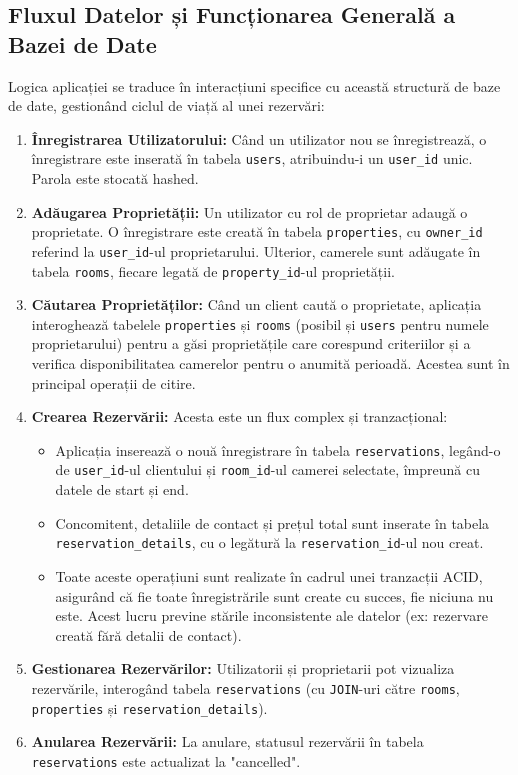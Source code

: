 \documentclass[12pt, a4paper, oneside, romanian]{teza-upb}
\begin{document}
\subsection{Fluxul Datelor și Funcționarea Generală a Bazei de Date}
Logica aplicației se traduce în interacțiuni specifice cu această structură de baze de date, gestionând ciclul de viață al unei rezervări:

\begin{enumerate}
	\item \textbf{Înregistrarea Utilizatorului:} Când un utilizator nou se înregistrează, o înregistrare este inserată în tabela \texttt{users}, atribuindu-i un \texttt{user\_id} unic. Parola este stocată hashed.
	\item \textbf{Adăugarea Proprietății:} Un utilizator cu rol de proprietar adaugă o proprietate. O înregistrare este creată în tabela \texttt{properties}, cu \texttt{owner\_id} referind la \texttt{user\_id}-ul proprietarului. Ulterior, camerele sunt adăugate în tabela \texttt{rooms}, fiecare legată de \texttt{property\_id}-ul proprietății.
	\item \textbf{Căutarea Proprietăților:} Când un client caută o proprietate, aplicația interoghează tabelele \texttt{properties} și \texttt{rooms} (posibil și \texttt{users} pentru numele proprietarului) pentru a găsi proprietățile care corespund criteriilor și a verifica disponibilitatea camerelor pentru o anumită perioadă. Acestea sunt în principal operații de citire.
	\item \textbf{Crearea Rezervării:} Acesta este un flux complex și tranzacțional:
	\begin{itemize}
		\item Aplicația inserează o nouă înregistrare în tabela \texttt{reservations}, legând-o de \texttt{user\_id}-ul clientului și \texttt{room\_id}-ul camerei selectate, împreună cu datele de start și end.
		\item Concomitent, detaliile de contact și prețul total sunt inserate în tabela \texttt{reservation\_details}, cu o legătură la \texttt{reservation\_id}-ul nou creat.
		\item Toate aceste operațiuni sunt realizate în cadrul unei tranzacții ACID, asigurând că fie toate înregistrările sunt create cu succes, fie niciuna nu este. Acest lucru previne stările inconsistente ale datelor (ex: rezervare creată fără detalii de contact).
	\end{itemize}
	\item \textbf{Gestionarea Rezervărilor:} Utilizatorii și proprietarii pot vizualiza rezervările, interogând tabela \texttt{reservations} (cu \texttt{JOIN}-uri către \texttt{rooms}, \texttt{properties} și \texttt{reservation\_details}). 
	\item \textbf{Anularea Rezervării:} La anulare, statusul rezervării în tabela \texttt{reservations} este actualizat la "cancelled".
\end{enumerate}
\end{document}
